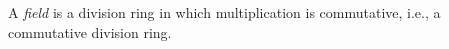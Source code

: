 A \emph{field} is a division ring in which multiplication is commutative, i.e., a commutative division ring.
